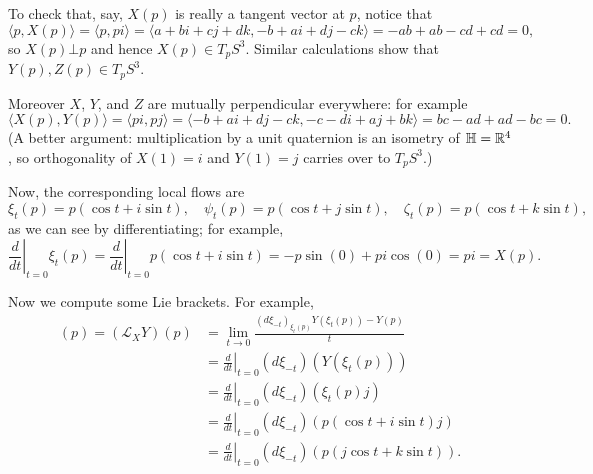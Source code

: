 To check that, say, $X(p)$ is really a tangent vector at $p$, notice that
\[
	\langle p, X(p)\rangle = \langle p, pi\rangle = \langle a + bi + cj + dk, -b + ai+dj-ck\rangle = -ab+ab-cd+cd = 0,
\]
so $X(p) \bot p$ and hence $X(p) \in T_pS^3$. Similar calculations show that $Y(p),Z(p) \in T_p S^3$.

Moreover $X$, $Y$, and $Z$ are mutually perpendicular everywhere: for example
\[
	\langle X(p) , Y(p) \rangle = \langle pi, pj\rangle = \langle -b+ai+dj-ck, -c-di+aj+bk\rangle = bc-ad+ad-bc = 0.
\]
(A better argument: multiplication by a unit quaternion is an isometry of $\mathbb{H} = \mathbb{R}^4$, so orthogonality of $X(1) = i$ and $Y(1) = j$ carries over to $T_pS^3$.)

Now, the corresponding local flows are
\[
	\xi_t(p) = p(\cos t + i \sin t), \quad \psi_t(p) = p(\cos t + j \sin t), \quad \zeta_t(p) = p(\cos t + k \sin t),
\]
as we can see by differentiating; for example,
\[
	\left. \frac{d}{dt}\right|_{t=0} \xi_t(p) = \left. \frac{d}{dt}\right|_{t=0}p (\cos t + i \sin t) = -p \sin(0) + p i \cos(0) = pi = X(p).
\]

Now we compute some Lie brackets. For example,
\begin{align*}
	[X,Y](p) = (\mathcal{L}_XY)(p) & = \lim_{t \to 0} \frac{(d\xi_{-t})_{\xi_t(p)}Y(\xi_t(p))-Y(p)}{t} \\
	& = \left. \frac{d}{dt}\right|_{t=0} (d\xi_{-t})(Y(\xi_t(p))) \\
	& = \left. \frac{d}{dt}\right|_{t=0} (d\xi_{-t})(\xi_t(p)j) \\
	& = \left. \frac{d}{dt}\right|_{t=0} (d\xi_{-t})(p(\cos t + i \sin t)j) \\
	& = \left. \frac{d}{dt}\right|_{t=0} (d\xi_{-t})(p(j\cos t + k \sin t)).
\end{align*}

